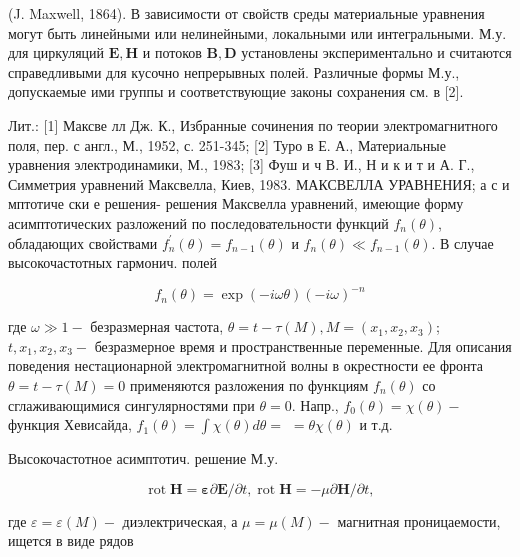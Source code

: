 \documentclass[10pt]{article}
\begin{document}
(J. Maxwell, 1864). В зависимости от свойств среды материальные уравнения могут быть линейными или нелинейными, локальными или интегральными. М.у. для циркуляций $\boldsymbol{E}, \boldsymbol{H}$ и потоков $\boldsymbol{B}, \boldsymbol{D}$ установлены экспериментально и считаются справедливыми для кусочно непрерывных полей. Различные формы М.у., допускаемые ими группы и соответствующие законы сохранения см. в [2].



Лит.: [1] Максве лл Дж. К., Избранные сочинения по теории электромагнитного поля, пер. с англ., М., 1952, с. 251-345; [2] Туро в Е. А., Материальные уравнения электродинамики, М., 1983; [3] Фуш и ч В. И., Н и к и т и А. Г., Симметрия уравнений Максвелла, Киев, 1983. МАКСВЕЛЛА УРАВНЕНИЯ; а с и мптотиче ски е решения- решения Максвелла уравнений, имеющие форму асимптотических разложений по последовательности функций $f_{n}(\theta)$, обладающих свойствами $f_{n}^{\prime}(\theta)=f_{n-1}(\theta)$ и $f_{n}(\theta) \ll f_{n-1}(\theta)$. В случае высокочастотных гармонич. полей



\[

f_{n}(\theta)=\exp (-i \omega \theta)(-i \omega)^{-n}

\]



где $\omega \gg 1-$ безразмерная частота, $\theta=t-\tau(M), M=\left(x_{1}, x_{2}, x_{3}\right)$; $t, x_{1}, x_{2}, x_{3}-$ безразмерное время и пространственные переменные. Для описания поведения нестационарной электромагнитной волны в окрестности ее фронта $\theta=t-\tau(M)=0$ применяются разложения по функциям $f_{n}(\theta)$ со сглаживающимися сингулярностями при $\theta=0$. Напр., $f_{0}(\theta)=\chi(\theta)-$ функция Хевисайда, $f_{1}(\theta)=\int \chi(\theta) d \theta=$ $=\theta \chi(\theta)$ и т.д.



Высокочастотное асимптотич. решение М.у.



\[

\operatorname{rot} \boldsymbol{H}=\boldsymbol{\varepsilon} \partial \boldsymbol{E} / \partial t, \operatorname{rot} \boldsymbol{H}=-\mu \partial \boldsymbol{H} / \partial t,

\]



где $\varepsilon=\varepsilon(M)-$ диэлектрическая, а $\mu=\mu(M)-$ магнитная проницаемости, ищется в виде рядов
\end{document}
